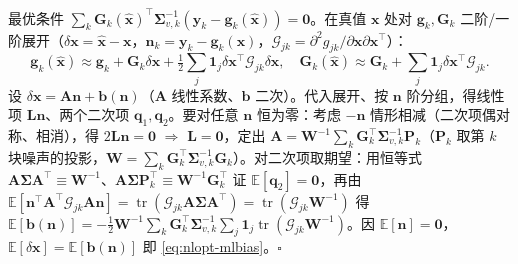 \begin{derivation}
最优条件 $\sum_k\mathbf{G}_k(\hat{\mathbf{x}})^\top\boldsymbol{\Sigma}_{v,k}^{-1}(\mathbf{y}_k-\mathbf{g}_k(\hat{\mathbf{x}}))=\mathbf{0}$。在真值 $\mathbf{x}$ 处对 $\mathbf{g}_k,\mathbf{G}_k$ 二阶/一阶展开（$\delta\mathbf{x}=\hat{\mathbf{x}}-\mathbf{x}$，$\mathbf{n}_k=\mathbf{y}_k-\mathbf{g}_k(\mathbf{x})$，$\boldsymbol{\mathcal{G}}_{jk}=\partial^2 g_{jk}/\partial\mathbf{x}\partial\mathbf{x}^\top$）：
\[
  \mathbf{g}_k(\hat{\mathbf{x}})\approx\mathbf{g}_k+\mathbf{G}_k\delta\mathbf{x}+\tfrac12\sum_j\mathbf{1}_j\delta\mathbf{x}^\top\boldsymbol{\mathcal{G}}_{jk}\delta\mathbf{x},\quad
  \mathbf{G}_k(\hat{\mathbf{x}})\approx\mathbf{G}_k+\sum_j\mathbf{1}_j\delta\mathbf{x}^\top\boldsymbol{\mathcal{G}}_{jk}.
\]
设 $\delta\mathbf{x}=\mathbf{A}\mathbf{n}+\mathbf{b}(\mathbf{n})$（$\mathbf{A}$ 线性系数、$\mathbf{b}$ 二次）。代入展开、按 $\mathbf{n}$ 阶分组，得线性项 $\mathbf{L}\mathbf{n}$、两个二次项 $\mathbf{q}_1,\mathbf{q}_2$。要对任意 $\mathbf{n}$ 恒为零：考虑 $-\mathbf{n}$ 情形相减（二次项偶对称、相消），得 $2\mathbf{L}\mathbf{n}=\mathbf{0}$ $\Rightarrow$ $\mathbf{L}=\mathbf{0}$，定出 $\mathbf{A}=\mathbf{W}^{-1}\sum_k\mathbf{G}_k^\top\boldsymbol{\Sigma}_{v,k}^{-1}\mathbf{P}_k$（$\mathbf{P}_k$ 取第 $k$ 块噪声的投影，$\mathbf{W}=\sum_k\mathbf{G}_k^\top\boldsymbol{\Sigma}_{v,k}^{-1}\mathbf{G}_k$）。对二次项取期望：用恒等式 $\mathbf{A}\boldsymbol{\Sigma}\mathbf{A}^\top\equiv\mathbf{W}^{-1}$、$\mathbf{A}\boldsymbol{\Sigma}\mathbf{P}_k^\top\equiv\mathbf{W}^{-1}\mathbf{G}_k^\top$ 证 $\mathbb{E}[\mathbf{q}_2]=\mathbf{0}$，再由 $\mathbb{E}[\mathbf{n}^\top\mathbf{A}^\top\boldsymbol{\mathcal{G}}_{jk}\mathbf{A}\mathbf{n}]=\operatorname{tr}(\boldsymbol{\mathcal{G}}_{jk}\mathbf{A}\boldsymbol{\Sigma}\mathbf{A}^\top)=\operatorname{tr}(\boldsymbol{\mathcal{G}}_{jk}\mathbf{W}^{-1})$ 得
$\mathbb{E}[\mathbf{b}(\mathbf{n})]=-\tfrac12\mathbf{W}^{-1}\sum_k\mathbf{G}_k^\top\boldsymbol{\Sigma}_{v,k}^{-1}\sum_j\mathbf{1}_j\operatorname{tr}(\boldsymbol{\mathcal{G}}_{jk}\mathbf{W}^{-1})$。因 $\mathbb{E}[\mathbf{n}]=\mathbf{0}$，$\mathbb{E}[\delta\mathbf{x}]=\mathbb{E}[\mathbf{b}(\mathbf{n})]$ 即 \cref{eq:nlopt-mlbias}。\hfill$\square$
\end{derivation}

